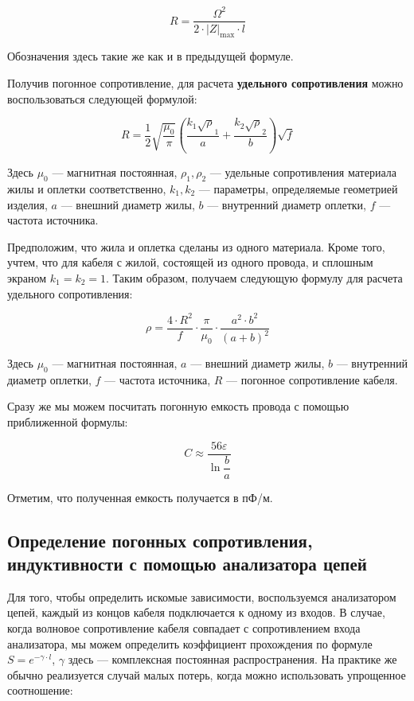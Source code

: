 \documentclass[a4paper, 12pt]{article}
\begin{document}
\begin{equation}
	R = \frac{\Omega^2}{2 \cdot |Z|_\text{max} \cdot l}
	\label{eq:1Resistance}
\end{equation}

Обозначения здесь такие же как и в предыдущей формуле.

Получив погонное сопротивление, для расчета \textbf{удельного сопротивления} можно воспользоваться следующей формулой:

\begin{equation*}
	R  = \frac{1}{2} \sqrt{\frac{\mu_{0}}{\pi}}\left(\frac{k_{1} \sqrt{\rho}_{1}}{a}+\frac{k_{2} \sqrt{\rho}_{2}}{b}\right) \sqrt{f}
\end{equation*}

Здесь $\mu_0$ --- магнитная постоянная, $\rho_1, \rho_2$ --- удельные сопротивления материала жилы и оплетки соответственно, $k_1, k_2$ --- параметры, определяемые геометрией изделия, $a$ --- внешний диаметр жилы, $b$ --- внутренний диаметр оплетки, $f$ --- частота источника. 

Предположим, что жила и оплетка сделаны из одного материала. Кроме того, учтем, что для кабеля с жилой, состоящей из одного провода, и сплошным экраном $k_1 = k_2 = 1$. Таким образом, получаем следующую формулу для расчета удельного сопротивления:

\begin{equation}
	\rho = \frac{4 \cdot R^2}{f} \cdot \frac{\pi}{\mu_0} \cdot \frac{a^2 \cdot b^2}{(a + b)^2}
	\label{eq:R}
\end{equation}

Здесь $\mu_0$ --- магнитная постоянная, $a$ --- внешний диаметр жилы, $b$ --- внутренний диаметр оплетки, $f$ --- частота источника, $R$ --- погонное сопротивление кабеля.

Сразу же мы можем посчитать погонную емкость провода с помощью приближенной формулы:

\begin{equation}
	C \approx \frac{56 \varepsilon}{\ln\dfrac{b}{a}}
	\label{eq:C}
\end{equation}

Отметим, что полученная емкость получается в пФ/м.

\subsection{Определение погонных сопротивления, индуктивности с помощью анализатора цепей}

Для того, чтобы определить искомые зависимости, воспользуемся анализатором цепей, каждый из концов кабеля подключается к одному из входов. В случае, когда волновое сопротивление кабеля совпадает с сопротивлением входа анализатора, мы можем определить коэффициент прохождения по формуле $S = e^{-\gamma \cdot l}$, $\gamma$ здесь --- комплексная постоянная распространения. На практике же обычно реализуется случай малых потерь, когда можно использовать упрощенное соотношение:
\end{document}
